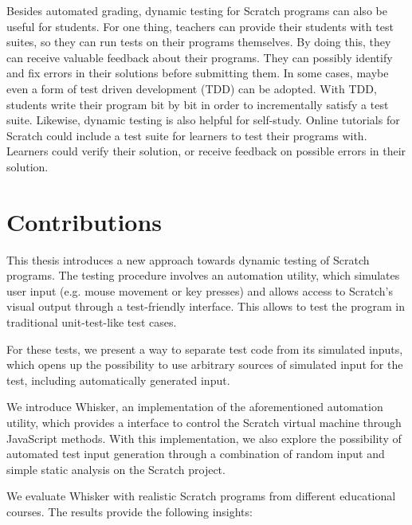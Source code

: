 Besides automated grading, dynamic testing for Scratch programs can also be useful for students.
For one thing, teachers can provide their students with test suites, so they can run tests on their programs themselves.
By doing this, they can receive valuable feedback about their programs.
They can possibly identify and fix errors in their solutions before submitting them.
In some cases, maybe even a form of test driven development (TDD) can be adopted.
With TDD, students write their program bit by bit in order to incrementally satisfy a test suite.
Likewise, dynamic testing is also helpful for self-study.
Online tutorials for Scratch could include a test suite for learners to test their programs with.
Learners could verify their solution, or receive feedback on possible errors in their solution.


\section{Contributions}

This thesis introduces a new approach towards dynamic testing of Scratch programs.
The testing procedure involves an automation utility, which simulates user input (e.g. mouse movement or key presses) and allows access to Scratch's visual output through a test-friendly interface.
This allows to test the program in traditional unit-test-like test cases.
\parspace

For these tests, we present a way to separate test code from its simulated inputs,
which opens up the possibility to use arbitrary sources of simulated input for the test,
including automatically generated input.
\parspace

We introduce Whisker, an implementation of the aforementioned automation utility,
which provides a interface to control the Scratch virtual machine through JavaScript methods.
With this implementation, we also explore the possibility of automated test input generation through a combination of random input and simple static analysis on the Scratch project.
\parspace

We evaluate Whisker with realistic Scratch programs from different educational courses.
The results provide the following insights:

